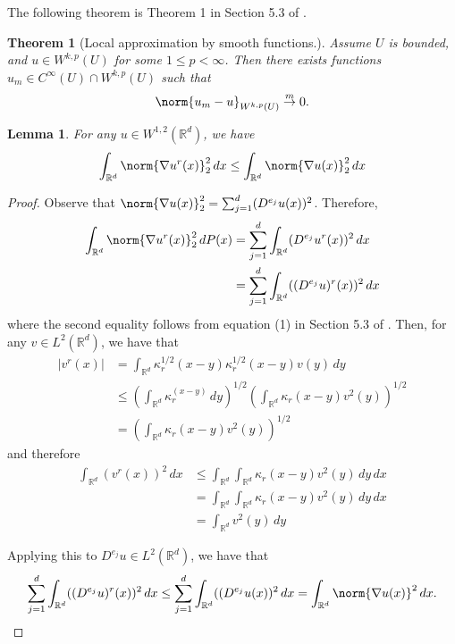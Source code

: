 \documentclass{article}
\newcommand{\Reals}{\mathbb{R}}
\newcommand{\abs}[1]{\left \lvert #1 \right \rvert}
\newcommand{\1}{\mathbb{I}}
\newcommand{\Rd}{\Reals^d}
\theoremstyle{alden}
\theoremstyle{aldenthm}
\newtheorem{theorem}{Theorem}
\newtheorem{lemma}{Lemma}
\theoremstyle{definition}
\theoremstyle{remark}
\begin{document}
The following theorem is Theorem 1 in Section 5.3 of \citep{evans10}.
\begin{theorem}[Local approximation by smooth functions.]
	\label{thm:local_approx_smooth_functions}
	Assume $U$ is bounded, and $u \in W^{k,p}(U)$ for some $1 \leq p < \infty$. Then there exists functions $u_m \in C^{\infty}(U) \cap W^{k,p}(U)$ such that
	\begin{equation*}
	\norm{u_m - u}_{W^{k,p}(U)} \overset{m}{\to} 0.
	\end{equation*}
\end{theorem}

\begin{lemma}
	\label{lem:gradient_mollify_commute}
	For any $u \in W^{1,2}(\Rd)$, we have
	\begin{equation*}
	\int_{\Reals^d} \norm{\nabla u^r(x)}_2^2 \,dx \leq \int_{\Reals^d} \norm{\nabla u(x)}_2^2 \,dx
	\end{equation*}
\end{lemma}
\begin{proof}
	Observe that $\norm{\nabla u(x)}_2^2 = \sum_{j = 1}^{d} (D^{e_j}u(x))^2 $. Therefore,
	\begin{align*}
	\int_{\Rd} \norm{\nabla u^r(x)}_2^2 \,dP(x) & = \sum_{j = 1}^{d} \int_{\Rd} (D^{e_j}u^r(x))^2 \,dx \\
	& = \sum_{j = 1}^{d} \int_{\Rd} ((D^{e_j}u)^r(x))^2 \,dx
	\end{align*}
	where the second equality follows from equation (1) in Section 5.3 of \citep{evans10}. Then, for any $v \in L^2(\Rd)$, we have that
	\begin{align*}
	\abs{v^r(x)} & = \int_{\Rd} \kappa_r^{1/2}(x - y) \kappa_r^{1/2}(x - y) v(y) \,dy \\
	& \leq \left(\int_{\Rd} \kappa_r^(x - y) \,dy\right)^{1/2} \left(\int_{\Rd} \kappa_r(x - y) v^2(y) \right)^{1/2} \\
	& = \left(\int_{\Rd} \kappa_r(x - y) v^2(y) \right)^{1/2}
	\end{align*}
	and therefore
	\begin{align*}
	\int_{\Rd} (v^r(x))^2 \,dx & \leq \int_{\Rd} \int_{\Rd } \kappa_r(x - y) v^2(y) \,dy \,dx \\
	& = \int_{\Rd} \int_{\Rd } \kappa_r(x - y) v^2(y) \,dy \,dx \\
	& = \int_{\Rd} v^2(y) \,dy
	\end{align*}

	Applying this to $D^{e_j}u \in L^2(\Rd)$, we have that
	\begin{equation*}
	\sum_{j = 1}^{d} \int_{\Rd} ((D^{e_j}u)^r(x))^2 \,dx \leq \sum_{j = 1}^{d} \int_{\Rd} ((D^{e_j}u(x))^2 \,dx = \int_{\Rd} \norm{\nabla u(x)}^2 \,dx.
	\end{equation*}
\end{proof}




\end{document}
